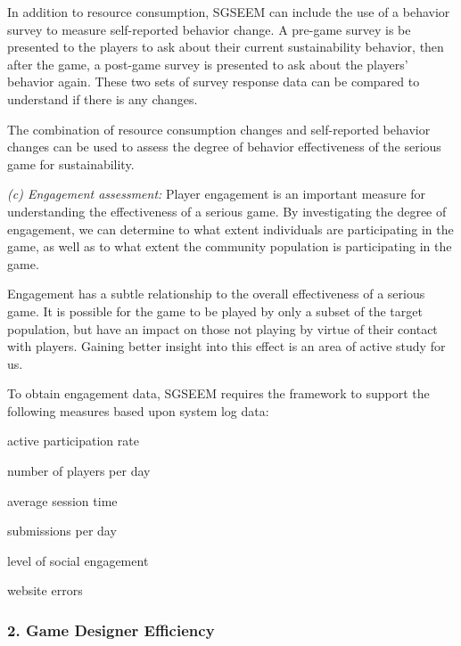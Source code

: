 \documentclass{sigchi}
\begin{document}
In addition to resource consumption, SGSEEM can include the use of a
behavior survey to measure self-reported behavior
change. A pre-game survey is be presented to the players to ask about
their current sustainability behavior, then after the game, a post-game
survey is presented to ask about the players' behavior again. These two
sets of survey response data can be compared to understand if there is
any changes.

The combination of resource consumption changes and self-reported
behavior changes can be used to assess the degree of behavior
effectiveness of the serious game for sustainability.

\emph {(c) Engagement assessment:} Player engagement is an important measure for
understanding the effectiveness of a serious game. By investigating the degree of
engagement, we can determine to what extent individuals are participating in the game, as
well as to what extent the community population is participating in the game.


Engagement has a subtle relationship to the overall effectiveness of a serious game. It is
possible for the game to be played by only a subset of the target population, but
have an impact on those not playing by virtue of their contact with players. Gaining 
better insight into this effect is an area of active study for us. 

To obtain engagement data, SGSEEM requires the framework to support the following measures
based upon system log data: 

\begin{compactitem}
\item active participation rate
\item number of players per day
\item average session time
\item submissions per day
\item level of social engagement
\item website errors
\end{compactitem}


\subsubsection{2. Game Designer Efficiency}

\end{document}
